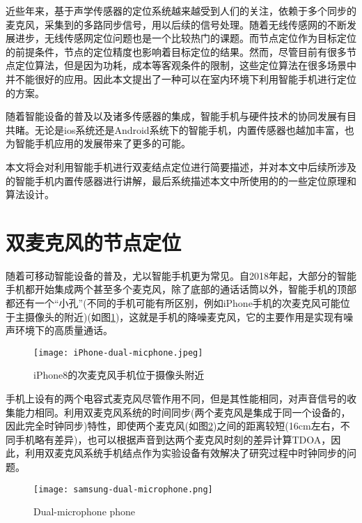\documentclass[winfonts]{njuthesis}
\begin{document}
	近些年来，基于声学传感器的定位系统越来越受到人们的关注，依赖于多个同步的麦克风，采集到的多路同步信号，用以后续的信号处理。随着无线传感网的不断发展进步，无线传感网定位问题也是一个比较热门的课题。而节点定位作为目标定位的前提条件，节点的定位精度也影响着目标定位的结果。然而，尽管目前有很多节点定位算法，但是因为功耗，成本等客观条件的限制，这些定位算法在很多场景中并不能很好的应用。因此本文提出了一种可以在室内环境下利用智能手机进行定位的方案。
	
	随着智能设备的普及以及诸多传感器的集成，智能手机与硬件技术的协同发展有目共睹。无论是ios系统还是Android系统下的智能手机，内置传感器也越加丰富，也为智能手机应用的发展带来了更多的可能。

	本文将会对利用智能手机进行双麦结点定位进行简要描述，并对本文中后续所涉及的智能手机内置传感器进行讲解，最后系统描述本文中所使用的的一些定位原理和算法设计。

	\section{双麦克风的节点定位}
	
	随着可移动智能设备的普及，尤以智能手机更为常见。自2018年起，大部分的智能手机都开始集成两个甚至多个麦克风，除了底部的通话话筒以外，智能手机的顶部都还有一个“小孔”(不同的手机可能有所区别，例如iPhone手机的次麦克风可能位于主摄像头的附近)(如图\ref{fig: iphone-dual-microphone})，这就是手机的降噪麦克风，它的主要作用是实现有噪声环境下的高质量通话。
	
	\begin{figure}[htbp]
		\centering
		\texttt{[image: iPhone-dual-micphone.jpeg]} 
		\caption{iPhone8的次麦克风手机位于摄像头附近}
		\label{fig: iphone-dual-microphone}
	\end{figure}
	
	手机上设有的两个电容式麦克风尽管作用不同，但是其性能相同，对声音信号的收集能力相同。利用双麦克风系统的时间同步(两个麦克风是集成于同一个设备的，因此完全时钟同步)特性，即使两个麦克风(如图\ref{fig: samsung-dual-microphone})之间的距离较短(16cm左右，不同手机略有差异)，也可以根据声音到达两个麦克风时刻的差异计算TDOA，因此，利用双麦克风系统手机结点作为实验设备有效解决了研究过程中时钟同步的问题。
	
	\begin{figure}[htbp]
		\centering
		\texttt{[image: samsung-dual-microphone.png]} 
		\caption{Dual-microphone phone}
		\label{fig: samsung-dual-microphone}
	\end{figure}
	
\end{document}
